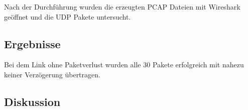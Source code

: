 Nach der Durchführung wurden die erzeugten PCAP Dateien mit Wireshark geöffnet und die UDP Pakete untersucht.

\subsection{Ergebnisse}
Bei dem Link ohne Paketverlust wurden alle 30 Pakete erfolgreich mit nahezu keiner Verzögerung übertragen.

\subsection{Diskussion}
